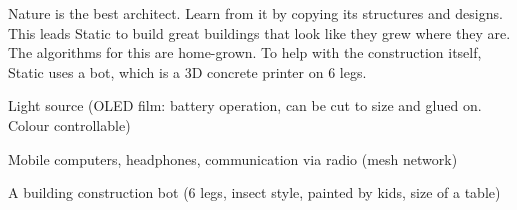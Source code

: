 \begin{npcBox}[title=Static - a Pioneer Bionics architect]
    \begin{stressSection}
    \end{stressSection}
    \begin{tabularx}{\textwidth}{ XX }
    \end{tabularx}

    \begin{consequences}
    \item {}
    \item {}
    \item {}
    \end{consequences}

    \begin{npcDescription}
    Nature is the best architect. Learn from it by copying its structures and designs.
    This leads Static to build great buildings that look like they grew where they are.
    The algorithms for this are home-grown. To help with the construction itself, Static uses a bot, which is a 3D concrete printer on 6 legs.
    \end{npcDescription}

    \begin{equipment}
        \item Light source (OLED film: battery operation, can be cut to size and glued on. Colour controllable)
        \item Mobile computers, headphones, communication via radio (mesh network)
        \item A building construction bot (6 legs, insect style, painted by kids, size of a table)
    \end{equipment}
\end{npcBox}

